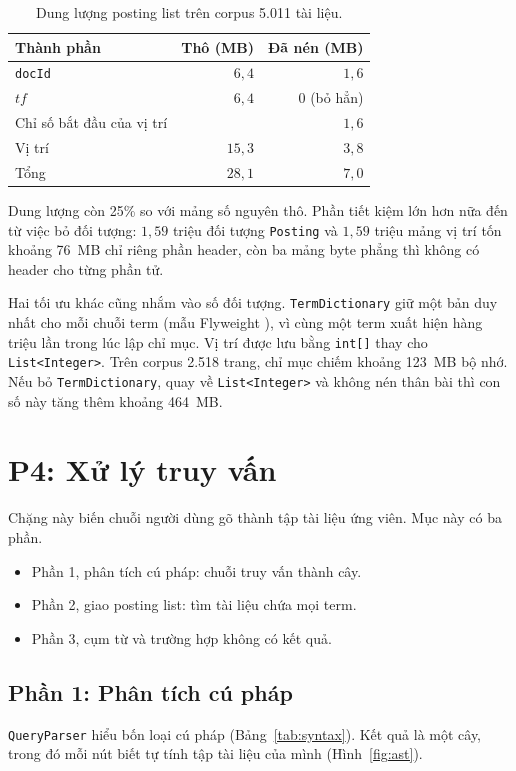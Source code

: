 \documentclass[9pt,twocolumn,a4paper]{extarticle}
\newcommand{\code}[1]{\texttt{#1}}
\begin{document}
\begin{table}[H]
\centering
\caption{Dung lượng posting list trên corpus 5.011 tài liệu.}
\label{tab:compress}
\footnotesize
\begin{tabular}{@{}lrr@{}}
\toprule
Thành phần & Thô (MB) & Đã nén (MB) \\
\midrule
\code{docId} & $6{,}4$ & $1{,}6$ \\
$tf$ & $6{,}4$ & 0 (bỏ hẳn) \\
Chỉ số bắt đầu của vị trí & & $1{,}6$ \\
Vị trí & $15{,}3$ & $3{,}8$ \\
\midrule
Tổng & $28{,}1$ & $7{,}0$ \\
\bottomrule
\end{tabular}
\end{table}

Dung lượng còn 25\% so với mảng số nguyên thô. Phần tiết kiệm lớn hơn nữa đến từ việc bỏ đối tượng: $1{,}59$ triệu đối tượng \code{Posting} và $1{,}59$ triệu mảng vị trí tốn khoảng 76~MB chỉ riêng phần header, còn ba mảng byte phẳng thì không có header cho từng phần tử.

Hai tối ưu khác cũng nhắm vào số đối tượng. \code{TermDictionary} giữ một bản duy nhất cho mỗi chuỗi term (mẫu Flyweight \cite{gamma1994design}), vì cùng một term xuất hiện hàng triệu lần trong lúc lập chỉ mục. Vị trí được lưu bằng \code{int[]} thay cho \code{List<Integer>}. Trên corpus 2.518 trang, chỉ mục chiếm khoảng 123~MB bộ nhớ. Nếu bỏ \code{TermDictionary}, quay về \code{List<Integer>} và không nén thân bài thì con số này tăng thêm khoảng 464~MB.

\section{P4: Xử lý truy vấn}
\label{chap:p4}
Chặng này biến chuỗi người dùng gõ thành tập tài liệu ứng viên. Mục này có ba phần.
\begin{itemize}\itemsep0pt
\item Phần 1, phân tích cú pháp: chuỗi truy vấn thành cây.
\item Phần 2, giao posting list: tìm tài liệu chứa mọi term.
\item Phần 3, cụm từ và trường hợp không có kết quả.
\end{itemize}

\subsection{Phần 1: Phân tích cú pháp}
\label{sec:parser}
\code{QueryParser} hiểu bốn loại cú pháp (Bảng~\ref{tab:syntax}). Kết quả là một cây, trong đó mỗi nút biết tự tính tập tài liệu của mình (Hình~\ref{fig:ast}).
\end{document}
